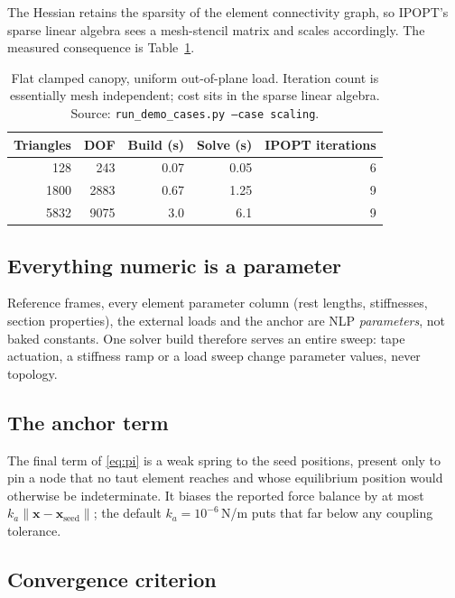 \documentclass[11pt,a4paper]{article}
\newcommand{\code}[1]{\texttt{\small #1}}
\begin{document}
The Hessian retains the sparsity of the element connectivity graph, so IPOPT's
sparse linear algebra sees a mesh-stencil matrix and scales accordingly. The
measured consequence is Table~\ref{tab:scaling}.

\begin{table}[H]
\centering
\caption{Flat clamped canopy, uniform out-of-plane load. Iteration count is
essentially mesh independent; cost sits in the sparse linear algebra.
Source: \code{run\_demo\_cases.py --case scaling}.}
\label{tab:scaling}
\begin{tabular}{rrrrr}
\toprule
Triangles & DOF & Build (s) & Solve (s) & IPOPT iterations \\
\midrule
128  & 243  & 0.07 & 0.05 & 6 \\
1800 & 2883 & 0.67 & 1.25 & 9 \\
5832 & 9075 & 3.0  & 6.1  & 9 \\
\bottomrule
\end{tabular}
\end{table}

\subsection{Everything numeric is a parameter}

Reference frames, every element parameter column (rest lengths, stiffnesses,
section properties), the external loads and the anchor are NLP
\emph{parameters}, not baked constants. One solver build therefore serves an
entire sweep: tape actuation, a stiffness ramp or a load sweep change parameter
values, never topology.

\subsection{The anchor term}
\label{sec:anchor}

The final term of \eqref{eq:pi} is a weak spring to the seed positions, present
only to pin a node that no taut element reaches and whose equilibrium position
would otherwise be indeterminate. It biases the reported force balance by at
most $k_a\lVert\mathbf{x}-\mathbf{x}_{\text{seed}}\rVert$; the default
$k_a = 10^{-6}$\,N/m puts that far below any coupling tolerance.

\subsection{Convergence criterion}
\end{document}
